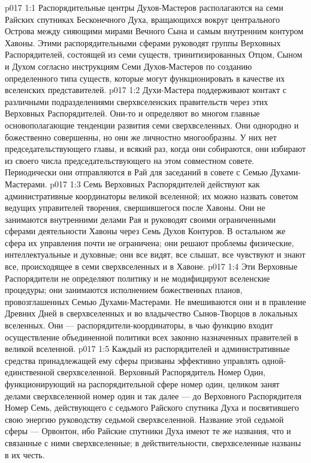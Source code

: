\vs p017 1:1 Распорядительные центры Духов\hyp{}Мастеров располагаются на семи Райских спутниках Бесконечного Духа, вращающихся вокруг центрального Острова между сияющими мирами Вечного Сына и самым внутренним контуром Хавоны. Этими распорядительными сферами руководят группы Верховных Распорядителей, состоящей из семи существ, тринитизированных Отцом, Сыном и Духом согласно инструкциям Семи Духов\hyp{}Мастеров по созданию определенного типа существ, которые могут функционировать в качестве их вселенских представителей.
\vs p017 1:2 Духи\hyp{}Мастера поддерживают контакт с различными подразделениями сверхвселенских правительств через этих Верховных Распорядителей. Они\hyp{}то и определяют во многом главные основополагающие тенденции развития семи сверхвселенных. Они однородно и божественно совершенны, но они же личностно многообразны. У них нет председательствующего главы, и всякий раз, когда они собираются, они избирают из своего числа председательствующего на этом совместном совете. Периодически они отправляются в Рай для заседаний в совете с Семью Духами\hyp{}Мастерами.
\vs p017 1:3 \pc Семь Верховных Распорядителей действуют как административные координаторы великой вселенной; их можно назвать советом ведущих управителей творения, свершившегося после Хавоны. Они не занимаются внутренними делами Рая и руководят своими ограниченными сферами деятельности Хавоны через Семь Духов Контуров. В остальном же сфера их управления почти не ограничена; они решают проблемы физические, интеллектуальные и духовные; они все видят, все слышат, все чувствуют и знают все, происходящее в семи сверхвселенных и в Хавоне.
\vs p017 1:4 Эти Верховные Распорядители не определяют политику и не модифицируют вселенские процедуры; они занимаются исполнением божественных планов, провозглашенных Семью Духами\hyp{}Мастерами. Не вмешиваются они и в правление Древних Дней в сверхвселенных и во владычество Сынов\hyp{}Творцов в локальных вселенных. Они --- распорядители\hyp{}координаторы, в чью функцию входит осуществление объединенной политики всех законно назначенных правителей в великой вселенной.
\vs p017 1:5 Каждый из распорядителей и административные средства принадлежащей ему сферы призваны эффективно управлять одной\hyp{}единственной сверхвселенной. Верховный Распорядитель Номер Один, функционирующий на распорядительной сфере номер один, целиком занят делами сверхвселенной номер один и так далее --- до Верховного Распорядителя Номер Семь, действующего с седьмого Райского спутника Духа и посвятившего свою энергию руководству седьмой сверхвселенной. Название этой седьмой сферы --- Орвонтон, ибо Райские спутники Духа имеют те же названия, что и связанные с ними сверхвселенные; в действительности, сверхвселенные названы в их честь.
